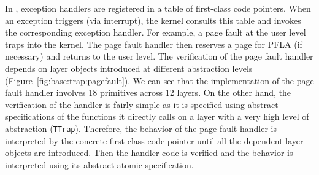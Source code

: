 In \mCTOSbase{}, exception handlers are registered in a table of first-class code pointers.
When an exception triggers (via interrupt), the kernel consults this table
and invokes the corresponding exception handler.
For example, a page fault at the user level traps into the kernel.
The page fault handler then reserves a page for PFLA (if necessary)
and returns to the user level.
The verification of the page fault handler depends on layer objects introduced
at different abstraction levels (\cf Figure~\ref{fig:base:trap:pagefault}).
We can see that the
implementation of the page fault handler involves 18 primitives across
12 layers.  On the other hand, the verification of the handler is
fairly simple as it is specified using abstract specifications of the
functions it directly calls on a layer with a very high level of
abstraction (\verb"TTrap").
Therefore, the behavior of the page fault handler is interpreted by
the concrete first-class code pointer until all the dependent layer
objects are introduced.  Then the handler code is verified and
the behavior is interpreted using its abstract atomic specification.





